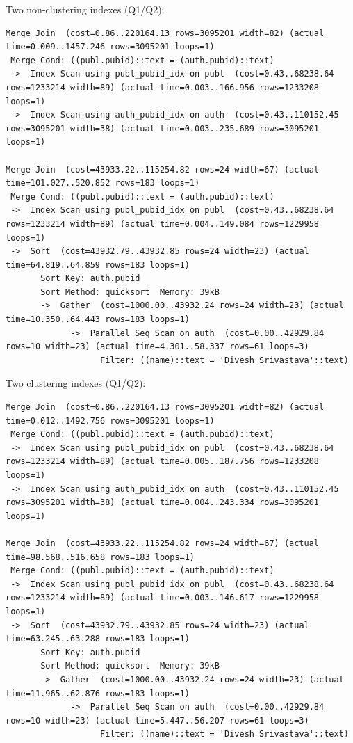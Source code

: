 \documentclass[11pt]{scrartcl}
\begin{document}
Two non-clustering indexes (Q1/Q2):
{\small
\parskip0pt\begin{verbatim}
Merge Join  (cost=0.86..220164.13 rows=3095201 width=82) (actual time=0.009..1457.246 rows=3095201 loops=1)
 Merge Cond: ((publ.pubid)::text = (auth.pubid)::text)
 ->  Index Scan using publ_pubid_idx on publ  (cost=0.43..68238.64 rows=1233214 width=89) (actual time=0.003..166.956 rows=1233208 loops=1)
 ->  Index Scan using auth_pubid_idx on auth  (cost=0.43..110152.45 rows=3095201 width=38) (actual time=0.003..235.689 rows=3095201 loops=1)

Merge Join  (cost=43933.22..115254.82 rows=24 width=67) (actual time=101.027..520.852 rows=183 loops=1)
 Merge Cond: ((publ.pubid)::text = (auth.pubid)::text)
 ->  Index Scan using publ_pubid_idx on publ  (cost=0.43..68238.64 rows=1233214 width=89) (actual time=0.004..149.084 rows=1229958 loops=1)
 ->  Sort  (cost=43932.79..43932.85 rows=24 width=23) (actual time=64.819..64.859 rows=183 loops=1)
       Sort Key: auth.pubid
       Sort Method: quicksort  Memory: 39kB
       ->  Gather  (cost=1000.00..43932.24 rows=24 width=23) (actual time=10.350..64.443 rows=183 loops=1)
             ->  Parallel Seq Scan on auth  (cost=0.00..42929.84 rows=10 width=23) (actual time=4.301..58.337 rows=61 loops=3)
                   Filter: ((name)::text = 'Divesh Srivastava'::text)
\end{verbatim}}

Two clustering indexes  (Q1/Q2):
{\small
\parskip0pt\begin{verbatim}
Merge Join  (cost=0.86..220164.13 rows=3095201 width=82) (actual time=0.012..1492.756 rows=3095201 loops=1)
 Merge Cond: ((publ.pubid)::text = (auth.pubid)::text)
 ->  Index Scan using publ_pubid_idx on publ  (cost=0.43..68238.64 rows=1233214 width=89) (actual time=0.005..187.756 rows=1233208 loops=1)
 ->  Index Scan using auth_pubid_idx on auth  (cost=0.43..110152.45 rows=3095201 width=38) (actual time=0.004..243.334 rows=3095201 loops=1)

Merge Join  (cost=43933.22..115254.82 rows=24 width=67) (actual time=98.568..516.658 rows=183 loops=1)
 Merge Cond: ((publ.pubid)::text = (auth.pubid)::text)
 ->  Index Scan using publ_pubid_idx on publ  (cost=0.43..68238.64 rows=1233214 width=89) (actual time=0.003..146.617 rows=1229958 loops=1)
 ->  Sort  (cost=43932.79..43932.85 rows=24 width=23) (actual time=63.245..63.288 rows=183 loops=1)
       Sort Key: auth.pubid
       Sort Method: quicksort  Memory: 39kB
       ->  Gather  (cost=1000.00..43932.24 rows=24 width=23) (actual time=11.965..62.876 rows=183 loops=1)
             ->  Parallel Seq Scan on auth  (cost=0.00..42929.84 rows=10 width=23) (actual time=5.447..56.207 rows=61 loops=3)
                   Filter: ((name)::text = 'Divesh Srivastava'::text)
\end{verbatim}}
\end{document}
